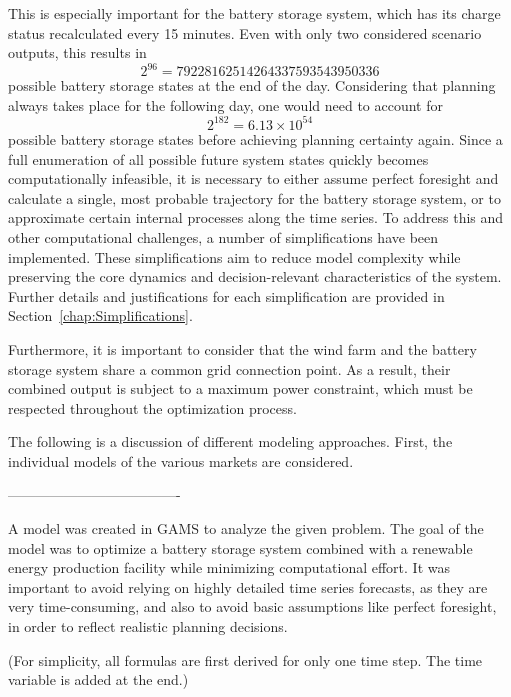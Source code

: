 This is especially important for the battery storage system, which has its charge status recalculated every 15 minutes.
Even with only two considered scenario outputs, this results in
\[
	2^{96} = 79228162514264337593543950336
\]
possible battery storage states at the end of the day.
Considering that planning always takes place for the following day,
one would need to account for
\[
	2^{182} = 6.13 \times 10^{54}
\]
possible battery storage states before achieving planning certainty again.
 Since a full enumeration of all possible future system states quickly becomes computationally infeasible,
it is necessary to either assume perfect foresight and calculate a single, most probable trajectory
for the battery storage system, or to approximate certain internal processes along the time series.
To address this and other computational challenges, a number of simplifications have been implemented.
These simplifications aim to reduce model complexity while preserving the core dynamics
and decision-relevant characteristics of the system.
Further details and justifications for each simplification are provided in Section~\ref{chap:Simplifications}.


Furthermore, it is important to consider that the wind farm and the battery storage system
share a common grid connection point. As a result, their combined output is subject to
a maximum power constraint, which must be respected throughout the optimization process.

The following is a discussion of different modeling approaches. First, the individual models of the various markets are considered.

-------------------------------------\\

A model was created in GAMS to analyze the given problem. The goal of the model was to optimize a battery storage system combined with a renewable energy production facility while minimizing computational effort.
It was important to avoid relying on highly detailed time series forecasts, as they are very time-consuming,
and also to avoid basic assumptions like perfect foresight, in order to reflect realistic planning decisions.

(For simplicity, all formulas are first derived for only one time step. The time variable is added at the end.)

